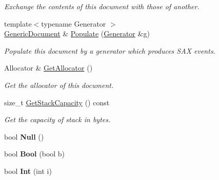 \begin{DoxyCompactItemize}
\begin{DoxyCompactList}\small\item\em Exchange the contents of this document with those of another. \end{DoxyCompactList}\item 
{\footnotesize template$<$typename Generator $>$ }\\\hyperlink{classGenericDocument}{Generic\+Document} \& \hyperlink{classGenericDocument_a36fbc7d0a9595d26e0d2c8859d207d1f}{Populate} (\hyperlink{structGenerator}{Generator} \&g)
\begin{DoxyCompactList}\small\item\em Populate this document by a generator which produces S\+AX events. \end{DoxyCompactList}\item 
\mbox{\label{classGenericDocument_aa4609d6b19f86aec1a6b96edf2c27686}} 
Allocator \& \hyperlink{classGenericDocument_aa4609d6b19f86aec1a6b96edf2c27686}{Get\+Allocator} ()
\begin{DoxyCompactList}\small\item\em Get the allocator of this document. \end{DoxyCompactList}\item 
\mbox{\label{classGenericDocument_a9e2e543c326b8b981d4f2c3d6793d15b}} 
size\+\_\+t \hyperlink{classGenericDocument_a9e2e543c326b8b981d4f2c3d6793d15b}{Get\+Stack\+Capacity} () const
\begin{DoxyCompactList}\small\item\em Get the capacity of stack in bytes. \end{DoxyCompactList}\item 
\mbox{\label{classGenericDocument_a87dc7f66b2b92660b8a43546733f9df2}} 
bool {\bfseries Null} ()
\item 
\mbox{\label{classGenericDocument_a4c44780642518dd34bd241a1ea0ceaf1}} 
bool {\bfseries Bool} (bool b)
\item 
\mbox{\label{classGenericDocument_a8cc986266becaa268474c607489745c7}} 
bool {\bfseries Int} (int i)
\item 
\mbox{\label{classGenericDocument_a530dd899a04a00ba74f52507b488d2c1}} 

\end{DoxyCompactItemize}
